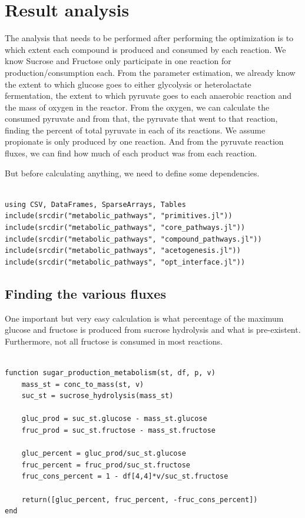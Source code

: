 \documentclass[11pt]{article}
\begin{document}
\section{Result analysis}
\label{sec:org6635a79}
The analysis that needs to be performed after performing the optimization is to which extent each compound is produced and consumed by each reaction. We know Sucrose and Fructose only participate in one reaction for production/consumption each. From the parameter estimation, we already know the extent to which glucose goes to either glycolysis or heterolactate fermentation, the extent to which pyruvate goes to each anaerobic reaction and the mass of oxygen in the reactor. From the oxygen, we can calculate the consumed pyruvate and from that, the pyruvate that went to that reaction, finding the percent of total pyruvate in each of its reactions. We assume propionate is only produced by one reaction. And from the pyruvate reaction fluxes, we can find how much of each product was from each reaction.

But before calculating anything, we need to define some dependencies.

\begin{verbatim}

using CSV, DataFrames, SparseArrays, Tables
include(srcdir("metabolic_pathways", "primitives.jl"))
include(srcdir("metabolic_pathways", "core_pathways.jl"))
include(srcdir("metabolic_pathways", "compound_pathways.jl"))
include(srcdir("metabolic_pathways", "acetogenesis.jl"))
include(srcdir("metabolic_pathways", "opt_interface.jl"))
\end{verbatim}

\subsection{Finding the various fluxes}
\label{sec:orge9e94cd}
One important but very easy calculation is what percentage of the maximum glucose and fructose is produced from sucrose hydrolysis and what is pre-existent. Furthermore, not all fructose is consumed in most reactions.

\begin{verbatim}

function sugar_production_metabolism(st, df, p, v)
    mass_st = conc_to_mass(st, v)
    suc_st = sucrose_hydrolysis(mass_st)

    gluc_prod = suc_st.glucose - mass_st.glucose
    fruc_prod = suc_st.fructose - mass_st.fructose

    gluc_percent = gluc_prod/suc_st.glucose
    fruc_percent = fruc_prod/suc_st.fructose
    fruc_cons_percent = 1 - df[4,4]*v/suc_st.fructose

    return([gluc_percent, fruc_percent, -fruc_cons_percent])
end
\end{verbatim}
\end{document}
